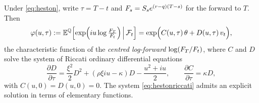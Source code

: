 \begin{theorem}\label{thm:hestoncharfn}
Under \eqref{eq:heston}, write $\tau = T-t$ and $F_s = S_s e^{(r-q)(T-s)}$ for the forward to $T$. Then
\begin{equation}\label{eq:hestoncf}
\varphi(u,\tau) := \mathbb{E}^{\mathbb{Q}}\Bigl[\exp\Bigl(iu\log\tfrac{F_T}{F_t}\Bigr)\,\Big|\,\mathcal{F}_t\Bigr] 
= \exp\Bigl( C(u,\tau)\,\theta + D(u,\tau)\,v_t \Bigr),
\end{equation}
the characteristic function of the \emph{centred log-forward} $\log(F_T/F_t)$, where $C$ and $D$ solve the system of Riccati ordinary differential equations
\begin{equation}\label{eq:hestonriccati}
\frac{\partial D}{\partial \tau} = \frac{\xi^2}{2}D^2 + (\rho\xi i u - \kappa)D - \frac{u^2+iu}{2}, 
\qquad
\frac{\partial C}{\partial \tau} = \kappa D,
\end{equation}
with $C(u,0)=D(u,0)=0$. The system \eqref{eq:hestonriccati} admits an explicit solution in terms of 
elementary functions. \qedopentext
\end{theorem}



